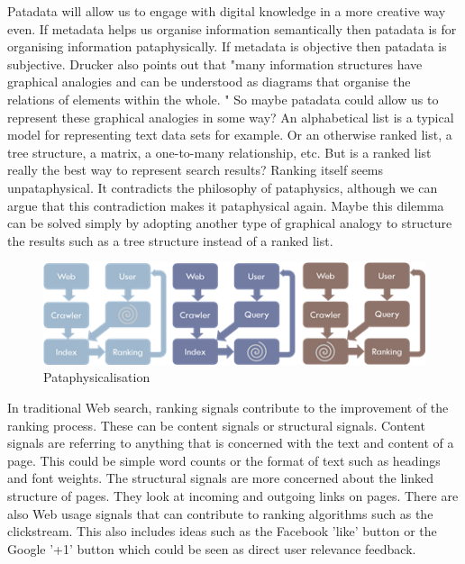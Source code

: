 Patadata will allow us to engage with digital knowledge in a more creative way even.  If metadata helps us organise information semantically then patadata is for organising information pataphysically. If metadata is objective then patadata is subjective. Drucker also points out that "many information structures have graphical analogies and can be understood as diagrams that organise the relations of elements within the whole. " \citep[p.16]{Drucker2009} So maybe patadata could allow us to represent these graphical analogies in some way? An alphabetical list is a typical model for representing text data sets for example. Or an otherwise ranked list, a tree structure, a matrix, a one-to-many relationship, etc. But is a ranked list really the best way to represent search results? Ranking itself seems unpataphysical. It contradicts the philosophy of pataphysics, although we can argue that this contradiction makes it pataphysical again. Maybe this dilemma can be solved simply by adopting another type of graphical analogy to structure the results such as a tree structure instead of a ranked list.


\begin{figure}[htb] %
  \centering
  \includegraphics[width=\linewidth]{images/patasearch02}
\caption[Pataphysicalisation]{Pataphysicalisation}
\label{fig:patasearch02}
\end{figure}

In traditional Web search, ranking signals contribute to the improvement of the ranking process. These can be content signals or structural signals. Content signals are referring to anything that is concerned with the text and content of a page. This could be simple word counts or the format of text such as headings and font weights. The structural signals are more concerned about the linked structure of pages. They look at incoming and outgoing links on pages. There are also Web usage signals that can contribute to ranking algorithms such as the clickstream. This also includes ideas such as the Facebook 'like' button or the Google '+1' button which could be seen as direct user relevance feedback.

